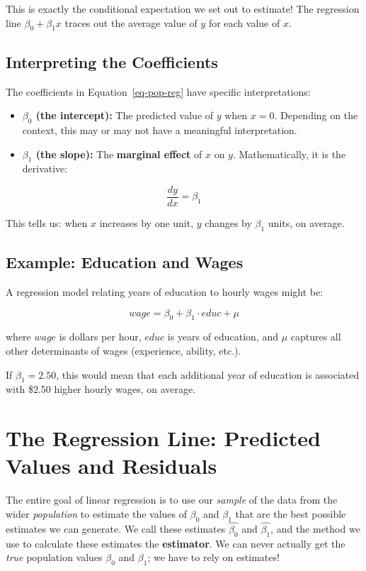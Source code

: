 \documentclass[
  letterpaper,
  DIV=11,
  numbers=noendperiod]{scrreprt}
\begin{document}
This is exactly the conditional expectation we set out to estimate! The
regression line \(\beta_0 + \beta_1 x\) traces out the average value of
\(y\) for each value of \(x\).

\subsection{Interpreting the
Coefficients}\label{interpreting-the-coefficients}

The coefficients in Equation~\ref{eq-pop-reg} have specific
interpretations:

\begin{itemize}
\item
  \textbf{\(\beta_0\) (the intercept):} The predicted value of \(y\)
  when \(x = 0\). Depending on the context, this may or may not have a
  meaningful interpretation.
\item
  \textbf{\(\beta_1\) (the slope):} The \textbf{marginal effect} of
  \(x\) on \(y\). Mathematically, it is the derivative:
\end{itemize}

\[
\frac{dy}{dx} = \beta_1
\]

This tells us: when \(x\) increases by one unit, \(y\) changes by
\(\beta_1\) units, on average.

\subsection{Example: Education and
Wages}\label{example-education-and-wages-1}

A regression model relating years of education to hourly wages might be:

\[
wage = \beta_0 + \beta_1 \cdot educ + \mu
\]

where \(wage\) is dollars per hour, \(educ\) is years of education, and
\(\mu\) captures all other determinants of wages (experience, ability,
etc.).

If \(\beta_1 = 2.50\), this would mean that each additional year of
education is associated with \$2.50 higher hourly wages, on average.

\section{The Regression Line: Predicted Values and
Residuals}\label{the-regression-line-predicted-values-and-residuals}

The entire goal of linear regression is to use our \emph{sample} of the
data from the wider \emph{population} to estimate the values of
\(\beta_0\) and \(\beta_1\) that are the best possible estimates we can
generate. We call these estimates \(\hat{\beta_0}\) and
\(\hat{\beta_1}\), and the method we use to calculate these estimates
the \textbf{estimator}. We can never actually get the \emph{true}
population values \(\beta_0\) and \(\beta_1\); we have to rely on
estimates!
\end{document}
